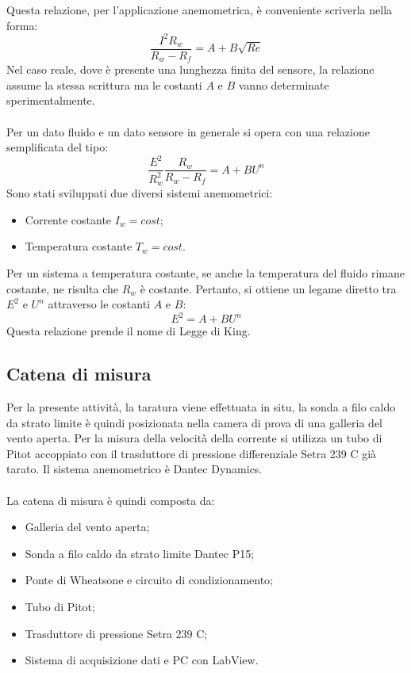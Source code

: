 Questa relazione, per l'applicazione anemometrica, è conveniente scriverla nella forma:
\begin{equation*}
    \frac{I^2R_w}{R_w-R_f} = A + B \sqrt{Re}
\end{equation*}
Nel caso reale, dove è presente una lunghezza finita del sensore, la relazione assume la stessa scrittura ma le costanti $A$ e $B$ vanno determinate sperimentalmente.\\\\
Per un dato fluido e un dato sensore in generale si opera con una relazione semplificata del tipo:
\begin{equation*}
    \frac{E^2}{R_w^2}\frac{R_w}{R_w-R_f} = A + B U^n
\end{equation*}
Sono stati sviluppati due diversi sistemi anemometrici:
\begin{itemize}
    \item Corrente costante $I_w=cost$;
    \item Temperatura costante $T_w=cost$.
\end{itemize}
Per un sistema a temperatura costante, se anche la temperatura del fluido rimane costante, ne risulta che $R_w$ è costante. Pertanto, si ottiene un legame diretto tra $E^2$ e $U^n$ attraverso le costanti $A$ e $B$:
\begin{equation*}
    E^2 = A + B U^n
\end{equation*}
Questa relazione prende il nome di Legge di King.

\subsection{Catena di misura}
Per la presente attività, la taratura viene effettuata in situ, la sonda a filo caldo da strato limite è quindi posizionata nella camera di prova di una galleria del vento aperta. Per la misura della velocità della corrente si utilizza un tubo di Pitot accoppiato con il trasduttore di pressione differenziale Setra 239 C già tarato. Il sistema anemometrico è Dantec Dynamics.\\\\
La catena di misura è quindi composta da:
\begin{itemize}
    \item Galleria del vento aperta;
    \item Sonda a filo caldo da strato limite Dantec P15;
    \item Ponte di Wheatsone e circuito di condizionamento;
    \item Tubo di Pitot;
    \item Trasduttore di pressione Setra 239 C;
    \item Sistema di acquisizione dati e PC con LabView.
\end{itemize}

